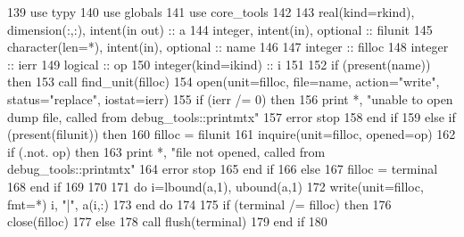 \begin{DoxyCode}
139       \textcolor{keywordtype}{use }typy
140       \textcolor{keywordtype}{use }globals
141       \textcolor{keywordtype}{use }core_tools
142 
143       \textcolor{keywordtype}{real(kind=rkind)}, \textcolor{keywordtype}{dimension(:,:)}, \textcolor{keywordtype}{intent(in out)} :: a
144       \textcolor{keywordtype}{integer}, \textcolor{keywordtype}{intent(in)}, \textcolor{keywordtype}{optional} :: filunit     
145       \textcolor{keywordtype}{character(len=*)}, \textcolor{keywordtype}{intent(in)}, \textcolor{keywordtype}{optional} :: name
146 
147       \textcolor{keywordtype}{integer} :: filloc
148       \textcolor{keywordtype}{integer} :: ierr
149       \textcolor{keywordtype}{logical} :: op
150       \textcolor{keywordtype}{integer(kind=ikind)} :: i
151       
152       \textcolor{keywordflow}{if} (\textcolor{keyword}{present}(name)) \textcolor{keywordflow}{then}
153         \textcolor{keyword}{call }find_unit(filloc)
154         \textcolor{keyword}{open}(unit=filloc, file=name, action=\textcolor{stringliteral}{"write"}, status=\textcolor{stringliteral}{"replace"}, iostat\textcolor{comment}{=ierr)}
155 \textcolor{comment}{        }\textcolor{keywordflow}{if} (ierr /= 0) \textcolor{keywordflow}{then}
156           print *, \textcolor{stringliteral}{"unable to open dump file, called from debug\_tools::printmtx"}
157           error stop
158 \textcolor{keywordflow}{        end if}
159       \textcolor{keywordflow}{else} \textcolor{keywordflow}{if} (\textcolor{keyword}{present}(filunit)) \textcolor{keywordflow}{then}
160         filloc = filunit
161         \textcolor{keyword}{inquire}(unit=filloc, opened=op)
162         \textcolor{keywordflow}{if} (.not. op) \textcolor{keywordflow}{then}
163           print *, \textcolor{stringliteral}{"file not opened, called from debug\_tools::printmtx"}
164           error stop
165 \textcolor{keywordflow}{        end if}
166       \textcolor{keywordflow}{else}
167         filloc = terminal
168 \textcolor{keywordflow}{      end if}
169       
170       
171       \textcolor{keywordflow}{do} i=lbound(a,1), ubound(a,1)
172         \textcolor{keyword}{write}(unit=filloc, fmt=*)  i, \textcolor{stringliteral}{"|"},  a(i,:)
173 \textcolor{keywordflow}{      end do}
174 
175       \textcolor{keywordflow}{if} (terminal /= filloc) \textcolor{keywordflow}{then}
176         \textcolor{keyword}{close}(filloc)
177       \textcolor{keywordflow}{else}
178         \textcolor{keyword}{call }flush(terminal)
179 \textcolor{keywordflow}{      end if}
180       
\end{DoxyCode}


